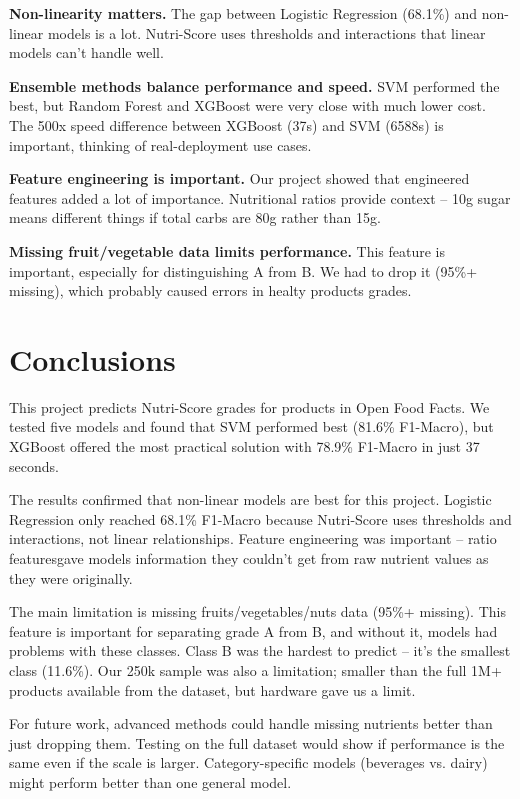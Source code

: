\documentclass[11pt,a4paper]{article}
\begin{document}
  \textbf{Non-linearity matters.} The gap between Logistic Regression (68.1\%) and non-linear models is a lot. Nutri-Score uses thresholds and interactions that linear models can't handle well.
  
  \textbf{Ensemble methods balance performance and speed.} SVM performed the best, but Random Forest and XGBoost were very close with much lower cost. The 500x speed difference between XGBoost (37s) and SVM (6588s) is important, thinking of real-deployment use cases.
  
  \textbf{Feature engineering is important.} Our project showed that engineered features added a lot of importance. Nutritional ratios provide context -- 10g sugar means different things if total carbs are 80g rather than 15g.
  
  \textbf{Missing fruit/vegetable data limits performance.} This feature is important, especially for distinguishing A from B. We had to drop it (95\%+ missing), which probably caused errors in healty products grades.
  




\section{Conclusions}

This project predicts Nutri-Score grades for products in Open Food Facts. We tested five models and found that SVM performed best (81.6\% F1-Macro), but XGBoost offered the most practical solution with 78.9\% F1-Macro in just 37 seconds.

The results confirmed that non-linear models are best for this project. Logistic Regression only reached 68.1\% F1-Macro because Nutri-Score uses thresholds and interactions, not linear relationships. Feature engineering was important -- ratio featuresgave models information they couldn't get from raw nutrient values as they were originally.

The main limitation is missing fruits/vegetables/nuts data (95\%+ missing). This feature is important for separating grade A from B, and without it, models had problems with these classes. Class B was the hardest to predict -- it's the smallest class (11.6\%). Our 250k sample was also a limitation; smaller than the full 1M+ products available from the dataset, but hardware gave us a limit.

For future work, advanced methods could handle missing nutrients better than just dropping them. Testing on the full dataset would show if performance is the same even if the scale is larger. Category-specific models (beverages vs. dairy) might perform better than one general model.
\end{document}
